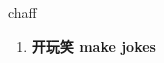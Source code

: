 
\begin{frame}
{\huge chaff}
\begin{center}
\begin{enumerate}\Large
  \item \textbf{开玩笑 make jokes}
\end{enumerate}
\end{center}
\end{frame}
